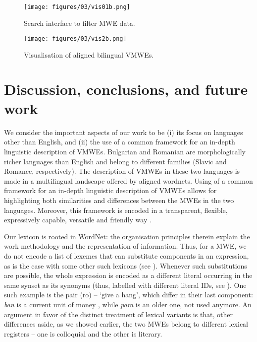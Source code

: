 \documentclass[output=paper,colorlinks,citecolor=brown]{langscibook}
\begin{document}
\begin{figure}\centering
\texttt{[image: figures/03/vis01b.png]}
\caption{Search interface to filter MWE data.}\label{fig:visualfilt}
\end{figure}

\begin{figure}\centering
\texttt{[image: figures/03/vis2b.png]}
\caption{Visualisation of aligned bilingual VMWEs.}\label{fig:visual}
\end{figure}

 
\clearpage
\section{Discussion, conclusions, and future work} \label{sec:discussion}\largerpage


We consider the important aspects of our work to be (i) its focus on languages other than English, and (ii) the use of a common framework for an in-depth linguistic description of VMWEs. Bulgarian and Romanian are morphologically richer languages than English and belong to different families (Slavic and Romance, respectively). The description of VMWEs in these two languages is made in a multilingual landscape offered by aligned wordnets. Using of a common framework for an in-depth linguistic description of VMWEs allows for highlighting both similarities and differences between the MWEs in the two languages. Moreover, this framework is encoded in a transparent, flexible, expressively capable, versatile and friendly way \citep{lichte-etal}. 

Our lexicon is rooted in WordNet: the organisation principles therein explain the work methodology and the representation of information. Thus, for a MWE, we do not encode a list of lexemes that can substitute components in an expression, as is the case with some other such lexicons (see ). Whenever such substitutions are possible, the whole expression is encoded as a different literal occurring in the same synset as its synonyms (thus, labelled with different literal IDs, see ). One such example is the pair (ro)  --  `give a hang', which differ in their last component: \textit{ban} is a current unit of money%
, while \textit{para} is an older one, not used anymore. An argument in favor of the distinct treatment of lexical variants is that, other differences aside, as we showed earlier, the two MWEs belong to different lexical registers -- one is colloquial and the other is literary.
\end{document}
